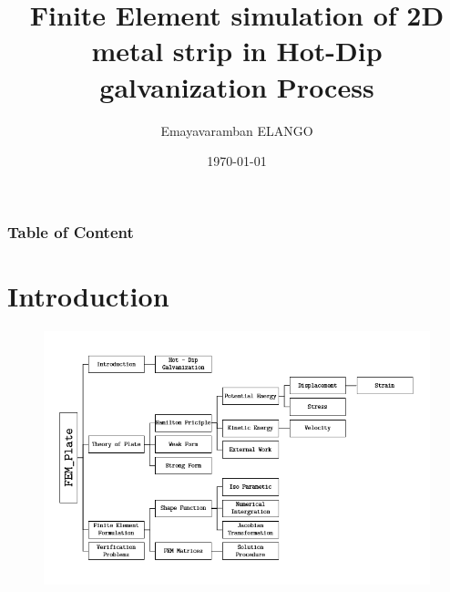 \documentclass[9pt]{beamer}
\title{Finite Element simulation of 2D metal strip in Hot-Dip galvanization Process}
\author{Emayavaramban ELANGO}
\institute{\'Ecole centrale De Nantes}
\date{\today}
\begin{document}


\begin{frame}
\maketitle
\end{frame}


\begin{frame}
\frametitle{Table of Content}
\tableofcontents
\end{frame}
\section{Introduction}

\begin{frame}
\begin{figure}[h!]
  \includegraphics[width=1\linewidth,trim={0 0 0 1cm},clip]{tree.png}
\end{figure}
\end{frame}
\end{document}
